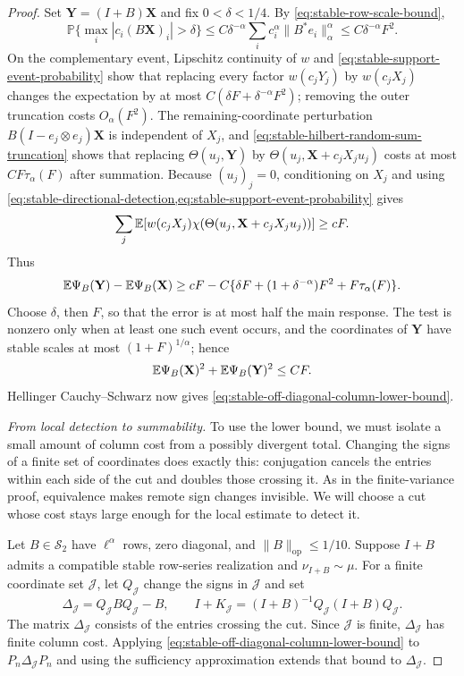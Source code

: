 \begin{proof}
Set \(\mathbf Y=(I+B)\mathbf X\) and fix \(0<\delta<1/4\).  By
\eqref{eq:stable-row-scale-bound},
\[
 \mathbb P\{\max_i|c_i(B\mathbf X)_i|>\delta\}
 \le C\delta^{-\alpha}\sum_i c_i^\alpha\|B^*e_i\|_\alpha^\alpha
 \le C\delta^{-\alpha}F^2.
\]
On the complementary event, Lipschitz continuity of \(w\) and
\eqref{eq:stable-support-event-probability} show that replacing every factor
\(w(c_jY_j)\) by \(w(c_jX_j)\) changes the expectation
by at most \(C(\delta F+\delta^{-\alpha}F^2)\); removing the outer
truncation costs \(O_\alpha(F^2)\).  The remaining-coordinate perturbation
\(B(I-e_j\otimes e_j)\mathbf X\) is independent of \(X_j\), and
\eqref{eq:stable-hilbert-random-sum-truncation} shows that replacing
\(\Theta(u_j,\mathbf Y)\) by
\(\Theta(u_j,\mathbf X+c_jX_ju_j)\) costs at most
\(C F\tau_\alpha(F)\) after summation.
Because \((u_j)_j=0\), conditioning on \(X_j\) and using
\cref{eq:stable-directional-detection,eq:stable-support-event-probability} gives
\[
 \sum_j\mathbb E\!\left[
   w(c_jX_j)\chi(\Theta(u_j,\mathbf X+c_jX_ju_j))\right]\ge c F.
\]
Thus
\[
 \mathbb E\Psi_B(\mathbf Y)-\mathbb E\Psi_B(\mathbf X)
 \ge c F-C\{\delta F+(1+\delta^{-\alpha})F^2
                              +F\tau_\alpha(F)\}.
\]
Choose \(\delta\), then \(F\), so that the error is at most half the main
response.
The test is nonzero only when at least one such event occurs, and the coordinates of
\(\mathbf Y\) have stable scales at most \((1+F)^{1/\alpha}\); hence
\[
 \mathbb E\Psi_B(\mathbf X)^2+\mathbb E\Psi_B(\mathbf Y)^2\le C F.
\]
Hellinger Cauchy--Schwarz now gives
\eqref{eq:stable-off-diagonal-column-lower-bound}.

\emph{From local detection to summability.}
To use the lower bound, we must isolate a small amount of column cost from
a possibly divergent total. Changing the signs of a finite set of
coordinates does exactly this: conjugation cancels the entries within
each side of the cut and doubles those crossing it. As in the finite-variance
proof, equivalence makes remote sign changes invisible. We will choose a
cut whose cost stays large enough for the local estimate to detect it.

Let \(B\in\mathcal S_2\) have \(\ell^\alpha\) rows, zero diagonal, and
\(\|B\|_{\mathrm{op}}\le1/10\).  Suppose
\(I+B\) admits a compatible stable row-series realization and
\(\nu_{I+B}\sim\mu\).
For a finite coordinate set \(\mathcal J\), let \(Q_{\mathcal J}\) change
the signs in \(\mathcal J\)
and set
\[
 \Delta_{\mathcal J}=Q_{\mathcal J}BQ_{\mathcal J}-B,
 \qquad
 I+K_{\mathcal J}=(I+B)^{-1}Q_{\mathcal J}(I+B)Q_{\mathcal J}.
\]
The matrix \(\Delta_{\mathcal J}\) consists of the entries crossing the cut.
Since \(\mathcal J\) is finite, \(\Delta_{\mathcal J}\) has finite column
cost.  Applying
\eqref{eq:stable-off-diagonal-column-lower-bound} to
\(P_n\Delta_{\mathcal J}P_n\) and using the sufficiency approximation extends
that bound to \(\Delta_{\mathcal J}\).


\end{proof}

